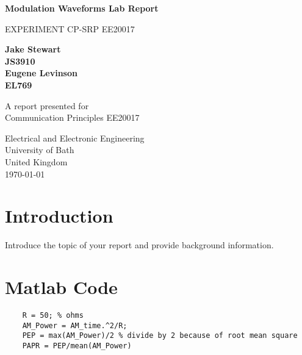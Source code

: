 \documentclass[15pt,a4paper]{article}
\begin{document}
\begin{titlepage}
    \begin{center}
        \vspace*{1cm}

        \Huge
        \textbf{Modulation Waveforms Lab Report}

        \vspace{0.5cm}
        \LARGE
        EXPERIMENT CP-SRP
        EE20017
        
        \vspace{1.5cm}

        \textbf{Jake Stewart}\\
        \textbf{JS3910}\\

        \textbf{Eugene Levinson}\\
        \textbf{EL769}\\

        \vfill
        
        A report presented for\\
        Communication Principles EE20017\\

        \vspace{0.8cm}

        
        \Large
        Electrical and Electronic Engineering\\
        University of Bath\\
        United Kingdom\\
        \today

    \end{center}
\end{titlepage}

\newpage
\tableofcontents
\newpage

\section{Introduction}
Introduce the topic of your report and provide background information.
\section{Matlab Code}

\begin{verbatim}
    R = 50; % ohms
    AM_Power = AM_time.^2/R;
    PEP = max(AM_Power)/2 % divide by 2 because of root mean square
    PAPR = PEP/mean(AM_Power)
\end{verbatim}
\end{document}
